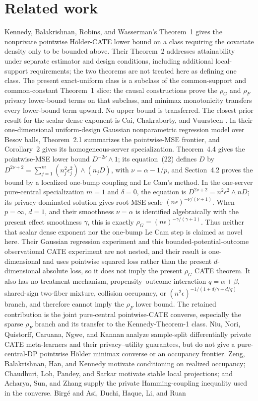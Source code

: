 \documentclass{article}
\begin{document}
\section{Related work}

Kennedy, Balakrishnan, Robins, and Wasserman's Theorem~1 gives the nonprivate pointwise Hölder-CATE lower bound on a class requiring the covariate density only to be bounded above.  Their Theorem~2 addresses attainability under separate estimator and design conditions, including additional local-support requirements; the two theorems are not treated here as defining one class.  The present exact-uniform class is a subclass of the common-support and common-constant Theorem~1 slice: the causal constructions prove the \(\rho_G\) and \(\rho_F\) privacy lower-bound terms on that subclass, and minimax monotonicity transfers every lower-bound term upward.  No upper bound is transferred.  The closest prior result for the scalar dense exponent is Cai, Chakraborty, and Vuursteen \cite{CaiChakrabortyVuursteen2026Regression}.  In their one-dimensional uniform-design Gaussian nonparametric regression model over Besov balls, Theorem~2.1 summarizes the pointwise-MSE frontier, and Corollary~2 gives its homogeneous-server specialization.  Theorem~4.4 gives the pointwise-MSE lower bound \(D^{-2\nu}\wedge1\); its equation~(22) defines \(D\) by \(D^{2\nu+2}=\sum_{j=1}^m(n_j^2\epsilon_j^2)\wedge(n_jD)\), with \(\nu=\alpha-1/p\), and Section~4.2 proves the bound by a localized one-bump coupling and Le Cam's method.  In the one-server pure-central specialization \(m=1\) and \(\delta=0\), the equation is \(D^{2\nu+2}=n^2\epsilon^2\wedge nD\); its privacy-dominated solution gives root-MSE scale \((n\epsilon)^{-\nu/(\nu+1)}\).  When \(p=\infty\), \(d=1\), and their smoothness \(\nu=\alpha\) is identified algebraically with the present effect smoothness \(\gamma\), this is exactly \(\rho_G=(n\epsilon)^{-\gamma/(\gamma+1)}\).  Thus neither that scalar dense exponent nor the one-bump Le Cam step is claimed as novel here.  Their Gaussian regression experiment and this bounded-potential-outcome observational CATE experiment are not nested, and their result is one-dimensional and uses pointwise squared loss rather than the present \(d\)-dimensional absolute loss, so it does not imply the present \(\rho_G\) CATE theorem.  It also has no treatment mechanism, propensity--outcome interaction \(q=\alpha+\beta\), shared-sign two-fiber mixture, collision occupancy, or \((n^2\epsilon)^{-1/(1+d/\gamma+d/q)}\) branch, and therefore cannot imply the \(\rho_F\) lower bound.  The retained contribution is the joint pure-central pointwise-CATE converse, especially the sparse \(\rho_F\) branch and its transfer to the Kennedy-Theorem-1 class.  Niu, Nori, Quistorff, Caruana, Ngwe, and Kannan analyze sample-split differentially private CATE meta-learners and their privacy--utility guarantees, but do not give a pure-central-DP pointwise Hölder minimax converse or an occupancy frontier.  Zeng, Balakrishnan, Han, and Kennedy motivate conditioning on realized occupancy; Chaudhuri, Loh, Pandey, and Sarkar motivate stable local projections; and Acharya, Sun, and Zhang supply the private Hamming-coupling inequality used in the converse.  Birgé and Asi, Duchi, Haque, Li, and Ruan 
\end{document}
